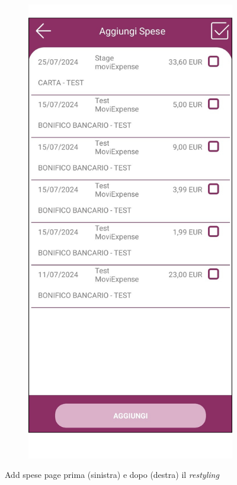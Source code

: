 \begin{figure}[H]
\begin{subfigure}{.5\textwidth}
        \includegraphics[width=.7\columnwidth]{images/screenshot/new/addSpese.png}\vspace{2mm}
    \end{subfigure}
    \caption{Add spese page prima (sinistra) e dopo (destra) il \emph{restyling}}
\end{figure}
